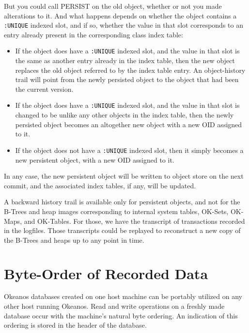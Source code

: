 \documentclass[article,oneside]{memoir}
\begin{document}
But you could call {\ttfamily PERSIST} on the old object, whether or not you made alterations to it. And what happens depends on whether the object contains a \texttt{:UNIQUE} indexed slot, and if so, whether the value in that slot corresponds to an entry already present in the corresponding class index table:

\begin{itemize}

\item If the object does have a \texttt{:UNIQUE} indexed slot, and the value in that slot is the same as another entry already in the index table, then the new object replaces the old object referred to by the index table entry. An object-history trail will point from the newly persisted object to the object that had been the current version.

\item If the object does have a \texttt{:UNIQUE} indexed slot, and the value in that slot is changed to be unlike any other objects in the index table, then the newly persisted object becomes an altogether new object with a new OID assigned to it.

\item If the object does not have a \texttt{:UNIQUE} indexed slot, then it simply becomes a new persistent object, with a new OID assigned to it.
\end{itemize}

In any case, the new persistent object will be written to object store on the next commit, and the associated index tables, if any, will be updated.

A backward history trail is available only for persistent objects, and not for the B-Trees and heap images corresponding to internal system tables, OK-Sets, OK-Maps, and OK-Tables. For those, we have the transcript of transactions recorded in the logfiles. Those transcripts could be replayed to reconstruct a new copy of the B-Trees and heaps up to any point in time.

\section{Byte-Order of Recorded Data}
Okeanos databases created on one host machine can be portably utilized on any other host running Okeanos. Read and write operations on a freshly made database occur with the machine's natural byte ordering. An indication of this ordering is stored in the header of the database. 
\end{document}
